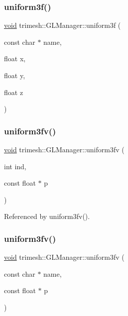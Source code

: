\subsubsection{\texorpdfstring{uniform3f()}{uniform3f()}\hspace{0.1cm}{\footnotesize\ttfamily [2/2]}}
{\footnotesize\ttfamily \hyperlink{namespacetrimesh_a784ddfd979e1c579bda795a8edfc3f43}{void} trimesh\+::\+G\+L\+Manager\+::uniform3f (\begin{DoxyParamCaption}\item[{const char $\ast$}]{name,  }\item[{float}]{x,  }\item[{float}]{y,  }\item[{float}]{z }\end{DoxyParamCaption})\hspace{0.3cm}{\ttfamily [inline]}}

\mbox{\label{classtrimesh_1_1GLManager_adeed58654a75c94ac5ca66e687ddb560}} 
\subsubsection{\texorpdfstring{uniform3fv()}{uniform3fv()}\hspace{0.1cm}{\footnotesize\ttfamily [1/2]}}
{\footnotesize\ttfamily \hyperlink{namespacetrimesh_a784ddfd979e1c579bda795a8edfc3f43}{void} trimesh\+::\+G\+L\+Manager\+::uniform3fv (\begin{DoxyParamCaption}\item[{int}]{ind,  }\item[{const float $\ast$}]{p }\end{DoxyParamCaption})\hspace{0.3cm}{\ttfamily [inline]}}



Referenced by uniform3fv().

\mbox{\label{classtrimesh_1_1GLManager_a66f8e6b8bfa571970e382cd9b5de6438}} 
\subsubsection{\texorpdfstring{uniform3fv()}{uniform3fv()}\hspace{0.1cm}{\footnotesize\ttfamily [2/2]}}
{\footnotesize\ttfamily \hyperlink{namespacetrimesh_a784ddfd979e1c579bda795a8edfc3f43}{void} trimesh\+::\+G\+L\+Manager\+::uniform3fv (\begin{DoxyParamCaption}\item[{const char $\ast$}]{name,  }\item[{const float $\ast$}]{p }\end{DoxyParamCaption})\hspace{0.3cm}{\ttfamily [inline]}}

